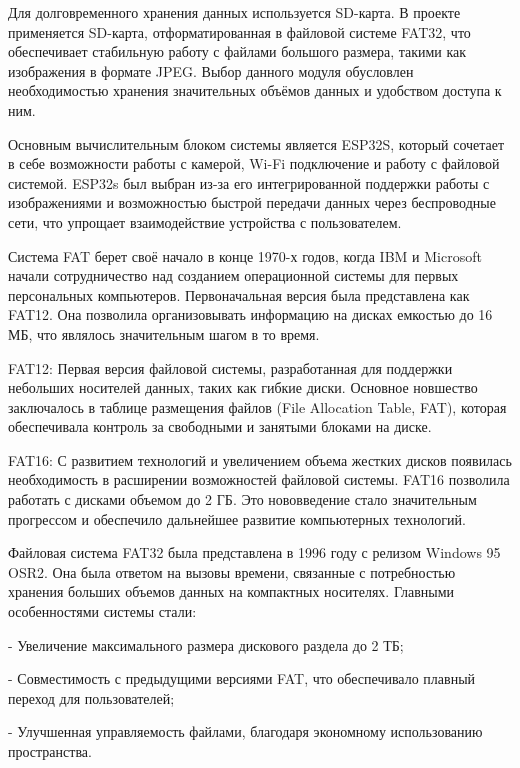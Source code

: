     Для долговременного хранения данных 
используется SD-карта. В проекте применяется SD-карта, 
отформатированная в файловой системе FAT32, что обеспечивает 
стабильную работу с файлами большого размера, такими как 
изображения в формате JPEG. Выбор данного модуля обусловлен 
необходимостью хранения значительных объёмов данных  
и удобством доступа к ним.

    Основным вычислительным 
блоком системы является ESP32S, который сочетает в себе 
возможности работы с камерой, Wi-Fi подключение и работу с 
файловой системой. ESP32s был выбран из-за его 
интегрированной поддержки работы с изображениями и 
возможностью быстрой передачи данных через беспроводные сети, 
что упрощает взаимодействие устройства с пользователем.

    Система FAT берет своё начало в конце 1970-х годов, когда IBM и 
Microsoft начали сотрудничество над созданием операционной системы 
для первых персональных компьютеров. Первоначальная версия была 
представлена как FAT12. Она позволила организовывать информацию на 
дисках емкостью до 16 МБ, что являлось значительным шагом в то время.

    FAT12: Первая версия файловой системы, разработанная для 
поддержки небольших носителей данных, таких как гибкие диски. 
Основное новшество заключалось в таблице размещения файлов (File 
Allocation Table, FAT), которая обеспечивала контроль за свободными 
и занятыми блоками на диске.

    FAT16: С развитием технологий и увеличением объема жестких 
дисков появилась необходимость в расширении возможностей файловой 
системы. FAT16 позволила работать с дисками объемом до 2 ГБ. Это 
нововведение стало значительным прогрессом и обеспечило дальнейшее 
развитие компьютерных технологий.

    Файловая система FAT32 была представлена в 1996 году с релизом 
Windows 95 OSR2. Она была ответом на вызовы времени, связанные с 
потребностью хранения больших объемов данных на компактных носителях. 
Главными особенностями системы стали:

    - Увеличение максимального размера дискового раздела до 2 ТБ;

    - Совместимость с предыдущими версиями FAT, что обеспечивало плавный переход для пользователей;

    - Улучшенная управляемость файлами, благодаря экономному использованию пространства\cite{fat}.


